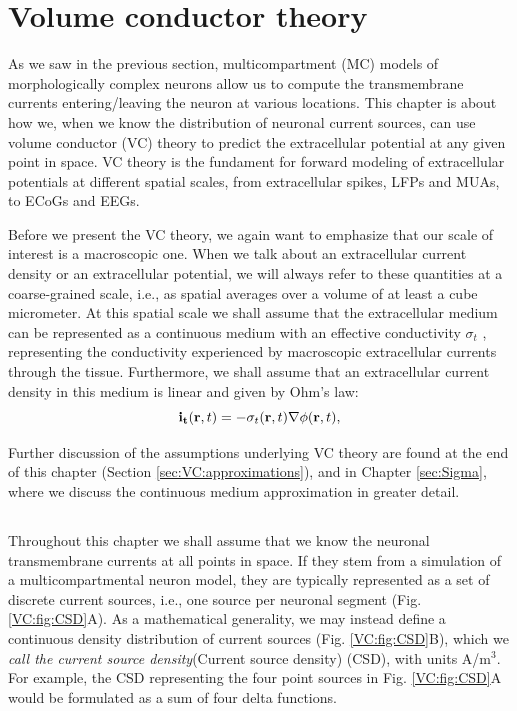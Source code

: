 \chapter{Volume conductor theory}
\label{sec:VC}
\label{chap:VC} %
As we saw in the previous section, multicompartment (MC) models of morphologically complex neurons allow us to compute the transmembrane currents entering/leaving the neuron at various locations. This chapter is about how we, when we know the distribution of neuronal current sources, can use volume conductor (VC) theory to predict the extracellular potential at any given point in space. VC theory is the fundament for forward modeling of extracellular potentials at different spatial scales, from extracellular spikes, LFPs and MUAs, to ECoGs and EEGs.

Before we present the VC theory, we again want to emphasize that our scale of interest is a macroscopic one. When we talk about an extracellular current density or an extracellular potential, we will always refer to these quantities at a coarse-grained scale, i.e., as spatial averages over a volume of at least a cube micrometer. At this spatial scale we shall assume that the extracellular medium can be represented as a continuous medium  with an effective conductivity $\sigma_t$  , representing the conductivity experienced by macroscopic extracellular currents through the tissue. Furthermore, we shall assume that an extracellular current density in this medium is linear and given by Ohm's law:
\begin{equation}
{\bf i_t}({\bf r}, t) = - \sigma_t({\bf r}, t) \nabla \phi({\bf r}, t),
\label{VC:eq:ohmici}
\end{equation}

Further discussion of the assumptions underlying VC theory are found at the end of this chapter (Section \ref{sec:VC:approximations}), and in Chapter \ref{sec:Sigma}, where we discuss the continuous medium approximation in greater detail.


\section{}
\label{sec:VC:main}
Throughout this chapter we shall assume that we know the neuronal transmembrane currents at all points in space. If they stem from a simulation of a multicompartmental neuron model, they are typically represented as a set of discrete current sources, i.e., one source per neuronal segment (Fig. \ref{VC:fig:CSD}A). As a mathematical generality, we may instead define a continuous density distribution of current sources (Fig. \ref{VC:fig:CSD}B), which we \textit{call the current source density}\index(Current source density) (CSD), with units A/m$^3$. For example, the CSD representing the four point sources in Fig. \ref{VC:fig:CSD}A would be formulated as a sum of four delta functions. 


